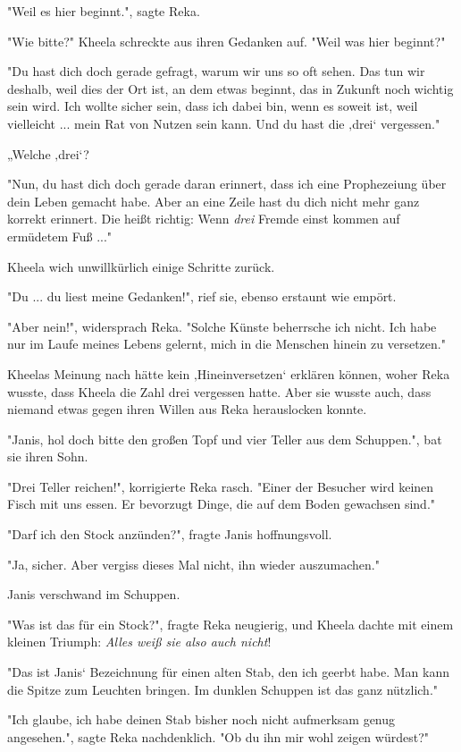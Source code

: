 \documentclass[10pt, a4paper, oneside]{book}
\begin{document}
\begin{multicols}{2}
"Weil es hier beginnt.", sagte Reka.

"Wie bitte?" Kheela schreckte aus ihren Gedanken auf. "Weil was hier beginnt?" 

"Du hast dich doch gerade gefragt, warum wir uns so oft sehen. Das tun wir deshalb, weil dies der Ort ist, an dem etwas beginnt, das in Zukunft noch wichtig sein wird. Ich wollte sicher sein, dass ich dabei bin, wenn es soweit ist, weil vielleicht ... mein Rat von Nutzen sein kann. Und du hast die ‚drei‘ vergessen." 

„Welche ‚drei‘?

"Nun, du hast dich doch gerade daran erinnert, dass ich eine Prophezeiung über dein Leben gemacht habe. Aber an eine Zeile hast du dich nicht mehr ganz korrekt erinnert. Die heißt richtig: Wenn \textit{drei} Fremde einst kommen auf ermüdetem Fuß ..." 

Kheela wich unwillkürlich einige Schritte zurück.

"Du ... du liest meine Gedanken!", rief sie, ebenso erstaunt wie empört. 

"Aber nein!", widersprach Reka. "Solche Künste beherrsche ich nicht. Ich habe nur im Laufe meines Lebens gelernt, mich in die Menschen hinein zu versetzen."

Kheelas Meinung nach hätte kein ‚Hineinversetzen‘ erklären können, woher Reka wusste, dass Kheela die Zahl drei vergessen hatte. Aber sie wusste auch, dass niemand etwas gegen ihren Willen aus Reka herauslocken konnte. 

"Janis, hol doch bitte den großen Topf und vier Teller aus dem Schuppen.", bat sie ihren Sohn. 

"Drei Teller reichen!", korrigierte Reka rasch. "Einer der Besucher wird keinen Fisch mit uns essen. Er bevorzugt Dinge, die auf dem Boden gewachsen sind." 

"Darf ich den Stock anzünden?", fragte Janis hoffnungsvoll.

"Ja, sicher. Aber vergiss dieses Mal nicht, ihn wieder auszumachen." 

Janis verschwand im Schuppen.

"Was ist das für ein Stock?", fragte Reka neugierig, und Kheela dachte mit 
einem kleinen Triumph: \textit{Alles weiß sie also auch nicht}!

"Das ist Janis‘ Bezeichnung für einen alten Stab, den ich geerbt habe. Man kann die Spitze zum Leuchten bringen. Im dunklen Schuppen ist das ganz nützlich." 

"Ich glaube, ich habe deinen Stab bisher noch nicht aufmerksam genug 
angesehen.", sagte Reka nachdenklich. "Ob du ihn mir wohl zeigen würdest?" 


\end{multicols}
\end{document}
